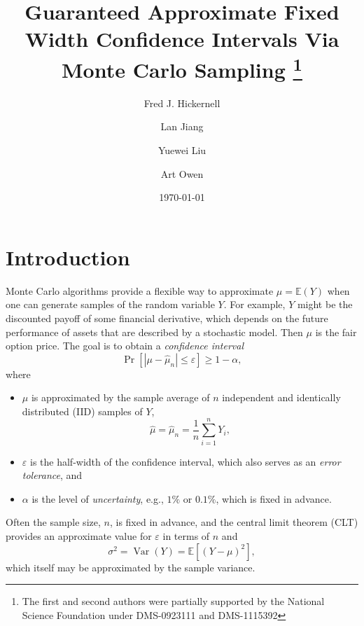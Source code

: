 \documentclass[graybox]{svmult}
\newcommand\e{\mathbb{E}}
\newcommand{\Prob}{\Pr}
\newcommand{\abs}[1]{\left|#1\right|}
\DeclareMathOperator{\var}{Var}
\newcommand{\hmu}{\hat{\mu}}
\def\abs#1{\ensuremath{\left \lvert #1 \right \rvert}}
\begin{document}
\date{\today}
\title*{Guaranteed Approximate Fixed Width Confidence Intervals Via Monte Carlo Sampling
\thanks{The first and second authors were partially supported by the National
Science Foundation under DMS-0923111 and DMS-1115392}}
\author{Fred J. Hickernell \and
Lan Jiang \and Yuewei Liu \and Art Owen }
%
%
\maketitle



\section{Introduction}

Monte Carlo algorithms provide a flexible way to approximate $\mu = \e(Y)$ when one can generate samples of the random variable $Y$. For example, $Y$ might be the discounted payoff of some financial derivative, which depends on the future performance of assets that are described by a stochastic model.  Then $\mu$ is the fair option price.  The goal is to obtain a \emph{confidence interval} 
\begin{equation} \label{confint}
\Prob[\abs{\mu - \hmu_n} \le \varepsilon] \ge 1-\alpha,
\end{equation}
where 
\begin{itemize}

\item $\mu$ is approximated by the sample average of $n$ independent and identically distributed (IID) samples of $Y$,
\begin{equation} \label{eq:samplemean}
\hmu=\hmu_n = \frac 1n \sum_{i=1}^n Y_i,
\end{equation}

\item $\varepsilon$ is the half-width of the confidence interval, which also serves as an \emph{error tolerance}, and

\item $\alpha$ is the level of \emph{uncertainty}, e.g., $1\%$ or $0.1\%$, which is fixed in advance.

\end{itemize}
Often the sample size, $n$, is fixed in advance, and the central limit theorem (CLT) provides an approximate value for $\varepsilon$ in terms of $n$ and 
\begin{equation} \label{sigmadef}
\sigma^2=\var(Y)=\e[(Y-\mu)^2],
\end{equation}
which itself may be approximated by the sample variance.
\end{document}

